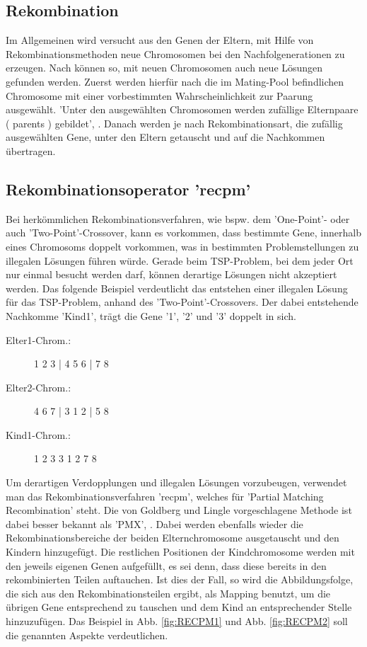 \subsection{Rekombination}
Im Allgemeinen wird versucht aus den Genen der Eltern, mit Hilfe von
Rekombinationsmethoden neue Chromosomen bei den Nachfolgenerationen
zu erzeugen. Nach \cite{ErbenSkript} können so, mit neuen Chromosomen
auch neue Lösungen gefunden werden. Zuerst werden hierfür nach
\cite{ErbenSkript} die im Mating-Pool befindlichen Chromosome mit
einer vorbestimmten Wahrscheinlichkeit zur Paarung ausgewählt. 
'Unter den ausgewählten Chromosomen werden zufällige Elternpaare ( parents )
gebildet', \cite{ErbenSkript}. Danach werden je nach Rekombinationsart,
die zufällig ausgewählten Gene, unter den Eltern getauscht und auf die
Nachkommen übertragen.

\subsection{Rekombinationsoperator 'recpm'}
Bei herkömmlichen Rekombinationsverfahren, wie bspw. dem 'One-Point'- oder
auch 'Two-Point'-Crossover, kann es vorkommen, dass bestimmte Gene, innerhalb
eines Chromosoms doppelt vorkommen, was in bestimmten Problemstellungen
zu illegalen Lösungen führen würde. Gerade beim TSP-Problem, bei dem
jeder Ort nur einmal besucht werden darf, können derartige Lösungen
nicht akzeptiert werden. Das folgende Beispiel verdeutlicht das entstehen
einer illegalen Lösung für das TSP-Problem, anhand des 'Two-Point'-Crossovers.
Der dabei entstehende Nachkomme 'Kind1', trägt die Gene '1', '2' und '3' doppelt
in sich.

\begin{description}
  \item[Elter1-Chrom.:] 1 2 3 | 4 5 6 | 7 8
  \item[Elter2-Chrom.:] 4 6 7 | 3 1 2 | 5 8
  \item[Kind1-Chrom.:]  1 2 3   3 1 2   7 8 
\end{description}

Um derartigen Verdopplungen und illegalen Lösungen vorzubeugen, verwendet
man das Rekombinationsverfahren 'recpm', welches für 
'Partial Matching Recombination' steht. Die von Goldberg und Lingle 
vorgeschlagene Methode ist dabei besser bekannt als 'PMX', 
\cite{Berg93}. Dabei werden ebenfalls wieder die Rekombinationsbereiche
der beiden Elternchromosome ausgetauscht und den Kindern hinzugefügt.
Die restlichen Positionen der Kindchromosome werden mit den jeweils
eigenen Genen aufgefüllt, es sei denn, dass diese bereits in den 
rekombinierten Teilen auftauchen. Ist dies der Fall, so wird die 
Abbildungsfolge, die sich aus den Rekombinationsteilen ergibt, als
Mapping benutzt, um die übrigen Gene entsprechend zu tauschen und dem
Kind an entsprechender Stelle hinzuzufügen. Das Beispiel in Abb.
\ref{fig:RECPM1} und Abb. \ref{fig:RECPM2} soll die genannten Aspekte
verdeutlichen. 

